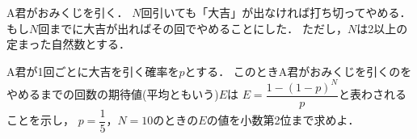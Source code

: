\documentclass[../../main.tex]{subfiles}
\begin{document}
A君がおみくじを引く．
$N$回引いても「大吉」が出なければ打ち切ってやめる．
もし$N$回までに大吉が出ればその回でやめることにした．
ただし，$N$は2以上の定まった自然数とする．

A君が1回ごとに大吉を引く確率を$p$とする．
このときA君がおみくじを引くのをやめるまでの回数の期待値(平均ともいう)$E$は
$\displaystyle E=\dfrac{1-{(1-p)}^N}{p}$と表わされることを示し，
$\displaystyle p=\dfrac{1}{5}$，$N=10$のときの$E$の値を小数第2位まで求めよ．
\end{document}

